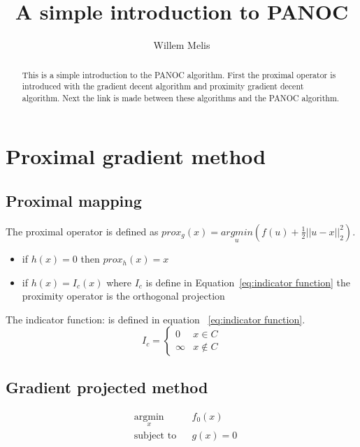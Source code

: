 \documentclass[]{article}
\title{A simple introduction to PANOC}
\author{Willem Melis}
\begin{document}
\maketitle

\begin{abstract}
This is a simple introduction to the PANOC algorithm. First the proximal operator is introduced with the  gradient decent algorithm and proximity gradient decent algorithm. Next the link is made between these algorithms and the PANOC algorithm.
\end{abstract}

\section{Proximal gradient method}
	\subsection{Proximal mapping}
		The proximal operator is defined as $prox_g(x)= \underset{u}{argmin}(f(u) + \frac{1}{2}||u-x||^2_2)$. 
		
		\begin{itemize}
			\item if $h(x)=0$ then $prox_h(x)=x$ 
			\item if $h(x)=I_c(x)$ where $I_c$ is define in Equation~\ref{eq:indicator function} the proximity operator is the orthogonal projection
		\end{itemize}
		
		The indicator function: is defined in equation ~\ref{eq:indicator function}.
		\begin{equation}
			I_c = 
			\begin{cases}
			0 & x \in C  \\
			\infty & x \notin C
			\end{cases}
			\label{eq:indicator function}
		\end{equation}
	
	\subsection{Gradient projected method}
		
		\begin{equation}
			\begin{aligned}
			& \underset{x}{\text{argmin}}
			& & f_0(x) \\
			& \text{subject to}
			& & g(x)=0
			\end{aligned}
			\label{eq:prox grad opti problem}
		\end{equation}
		
\end{document}
